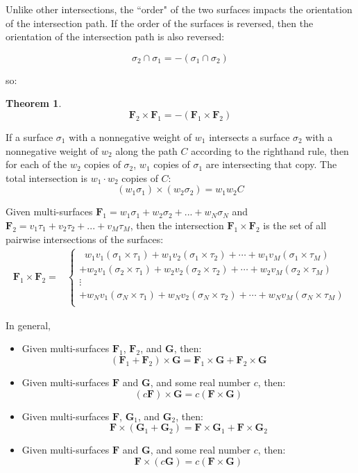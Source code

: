 \documentclass{book}
\newtheorem{thm}{Theorem}
\begin{document}
Unlike other intersections, the ``order" of the two surfaces impacts the orientation of the intersection path. If the order of the surfaces is reversed, then the orientation of the intersection path is also reversed:

\[\sigma_2 \cap \sigma_1 = -(\sigma_1 \cap \sigma_2)\]

so:

\begin{thm}
\[\mathbf{F}_2 \times \mathbf{F}_1 = -(\mathbf{F}_1 \times \mathbf{F}_2)\]
\end{thm}

If a surface \(\sigma_1\) with a nonnegative weight of \(w_1\) intersects a surface \(\sigma_2\) with a nonnegative weight of \(w_2\) along the path \(C\) according to the righthand rule, then for each of the \(w_2\) copies of \(\sigma_2\), \(w_1\) copies of \(\sigma_1\) are intersecting that copy. The total intersection is \(w_1 \cdot w_2\) copies of \(C\):
\[(w_1 \sigma_1) \times (w_2 \sigma_2) = w_1 w_2 C\] 

Given multi-surfaces \(\mathbf{F}_1 = w_1\sigma_1 + w_2\sigma_2 + ... + w_N\sigma_N\) and \\ \(\mathbf{F}_2 = v_1\tau_1 + v_2\tau_2 + ... + v_M\tau_M\), then the intersection \(\mathbf{F}_1 \times \mathbf{F}_2\) is the set of all pairwise intersections of the surfaces:
\begin{align*}
\mathbf{F}_1 \times \mathbf{F}_2 = & \left\{\begin{array}{c}
\;\; w_1 v_1 (\sigma_1 \times \tau_1) + w_1 v_2 (\sigma_1 \times \tau_2) + \cdots + w_1 v_M (\sigma_1 \times \tau_M) \\ 
+ w_2 v_1 (\sigma_2 \times \tau_1) + w_2 v_2 (\sigma_2 \times \tau_2) + \cdots + w_2 v_M (\sigma_2 \times \tau_M) \\ 
\vdots \\
+ w_N v_1 (\sigma_N \times \tau_1) + w_N v_2 (\sigma_N \times \tau_2) + \cdots + w_N v_M (\sigma_N \times \tau_M) \\ 
\end{array}\right.
\end{align*}

In general,
\begin{itemize}
\item Given multi-surfaces \(\mathbf{F}_1\), \(\mathbf{F}_2\), and \(\mathbf{G}\), then:
\[(\mathbf{F}_1 + \mathbf{F}_2) \times \mathbf{G} = \mathbf{F}_1 \times \mathbf{G} + \mathbf{F}_2 \times \mathbf{G}\] 
\item Given multi-surfaces \(\mathbf{F}\) and \(\mathbf{G}\), and some real number \(c\), then:
\[(c\mathbf{F}) \times \mathbf{G} = c(\mathbf{F} \times \mathbf{G})\]
\item Given multi-surfaces \(\mathbf{F}\), \(\mathbf{G}_1\), and \(\mathbf{G}_2\), then:
\[\mathbf{F} \times (\mathbf{G}_1 + \mathbf{G}_2) = \mathbf{F} \times \mathbf{G}_1 + \mathbf{F} \times \mathbf{G}_2\] 
\item Given multi-surfaces \(\mathbf{F}\) and \(\mathbf{G}\), and some real number \(c\), then:
\[\mathbf{F} \times (c\mathbf{G}) = c(\mathbf{F} \times \mathbf{G})\]
\end{itemize}
\end{document}
